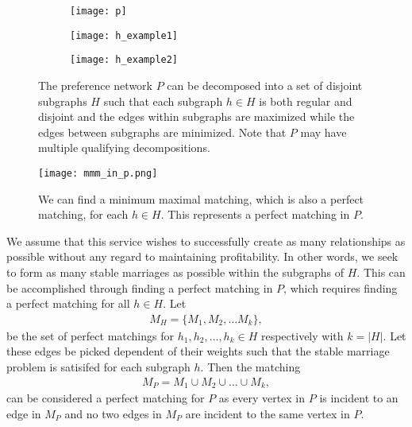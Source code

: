     \begin{figure}[t!]
    \centering
    \begin{subfigure}{.33\textwidth}
        \centering
        \texttt{[image: p]}
        \label{fig:pgraph}
    \end{subfigure}%
    \begin{subfigure}{.33\textwidth}
        \centering
        \texttt{[image: h\_example1]}
        \label{fig:hgraph1}
    \end{subfigure}
    \begin{subfigure}{.33\textwidth}
        \centering
        \texttt{[image: h\_example2]}
        \label{fig:hgraph2}
    \end{subfigure}
    \caption{The preference network $P$ can be decomposed into a set of disjoint subgraphs $H$ such that each subgraph $h \in H$ is both regular and disjoint and the edges within subgraphs are maximized while the edges between subgraphs are minimized. Note that $P$ may have multiple qualifying decompositions.}
    \label{fig:graphpartitioning}
    \end{figure}

\begin{figure}[t!]
    \centering
    \texttt{[image: mmm\_in\_p.png]}
    \caption{We can find a minimum maximal matching, which is also a perfect matching, for each $h \in H$. This represents a perfect matching in $P$.}
    \label{fig:mmm_in_p}
\end{figure}

We assume that this service wishes to successfully create as many relationships as possible without any regard to maintaining profitability. In other words, we seek to form as many stable marriages as possible within the subgraphs of $H$. This can be accomplished through finding a perfect matching in $P$, which requires finding a perfect matching for all $h \in H$. Let
\begin{align*}
M_{H} = \{M_{1}, M_{2}, \dots M_{k}\},
\end{align*}
be the set of perfect matchings for $h_{1}, h_{2}, \ldots, h_{k} \in H$ respectively with $k = |H|$. Let these edges be picked dependent of their weights such that the stable marriage problem is satisifed for each subgraph $h$. Then the matching
\begin{align*}
    M_{P} = M_{1} \cup M_{2} \cup \ldots \cup M_{k},
\end{align*}
can be considered a perfect matching for $P$ as every vertex in $P$ is incident to an edge in $M_{P}$ and no two edges in $M_{P}$ are incident to the same vertex in $P$. 

